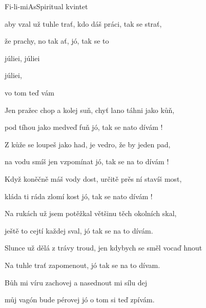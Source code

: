 \begin{song}{Fi-li-mi}{As}{Spiritual kvintet}
\begin{SBVerse}
 aby vzal už tuhle trať, kdo dáš práci, tak se strať,

že  prachy, no tak ať, jó, tak se to 


\end{SBVerse}
\begin{SBChorus}
 júliei,  júliei

 júliei,

vo tom teď vám
\end{SBChorus}
\begin{SBVerse}
Jen pražec chop a kolej suň, chyť lano táhni jako kůň, 

pod tíhou jako medveď fuň jó, tak se nato dívám !
\end{SBVerse}
\begin{SBVerse}
Z kůže se loupeš jako had, je vedro, že by jeden pad, 

na vodu smíš jen vzpomínat jó, tak se na to dívám !
\end{SBVerse}
\begin{SBVerse}
Když koněčně máš vody dost, určitě prěs ní stavíš most, 

kláda ti ráda zlomí kost jó, tak se nato dívám ! 

\end{SBVerse}
\begin{SBVerse}
Na rukách už jsem potěžkal většinu těch okolních skal, 

ještě to cejtí každej sval, jó tak se na to dívám.

\end{SBVerse}
\begin{SBVerse}
Slunce už dělá z trávy troud, jen kdybych se směl vocaď hnout

Na tuhle trať zapomenout, jó tak se na to dívam.
\end{SBVerse}
\begin{SBVerse}
Bůh mi víru zachovej a nasednout mi sílu dej

můj vagón bude pérovej jó o tom si teď zpívám.
\end{SBVerse}
\end{song}

\pagebreak